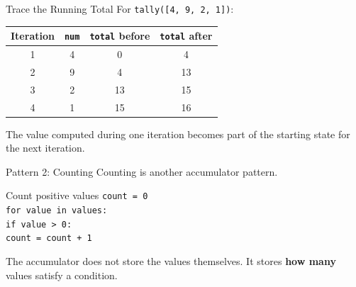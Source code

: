 \documentclass[aspectratio=169,10pt]{beamer}
\begin{document}
\begin{frame}{Trace the Running Total}
  For \texttt{tally([4, 9, 2, 1])}:

  \begin{center}
    \renewcommand{\arraystretch}{1.3}
    \begin{tabular}{c|c|c|c}
      \textbf{Iteration} & \textbf{\texttt{num}} & \textbf{\texttt{total} before} & \textbf{\texttt{total} after} \\\hline
      1 & 4 & 0 & 4 \\
      2 & 9 & 4 & 13 \\
      3 & 2 & 13 & 15 \\
      4 & 1 & 15 & 16
    \end{tabular}
  \end{center}

  \begin{keyidea}
    The value computed during one iteration becomes part of the starting state for the next iteration.
  \end{keyidea}
\end{frame}



\begin{frame}{Pattern 2: Counting}
  Counting is another accumulator pattern.

  \begin{block}{Count positive values}
    \texttt{count = 0}\\
    \texttt{for value in values:}\\
    \hspace{0.20in}\texttt{if value > 0:}\\
    \hspace{0.40in}\texttt{count = count + 1}
  \end{block}

  The accumulator does not store the values themselves. It stores \textbf{how many} values satisfy a condition.
\end{frame}
\end{document}
